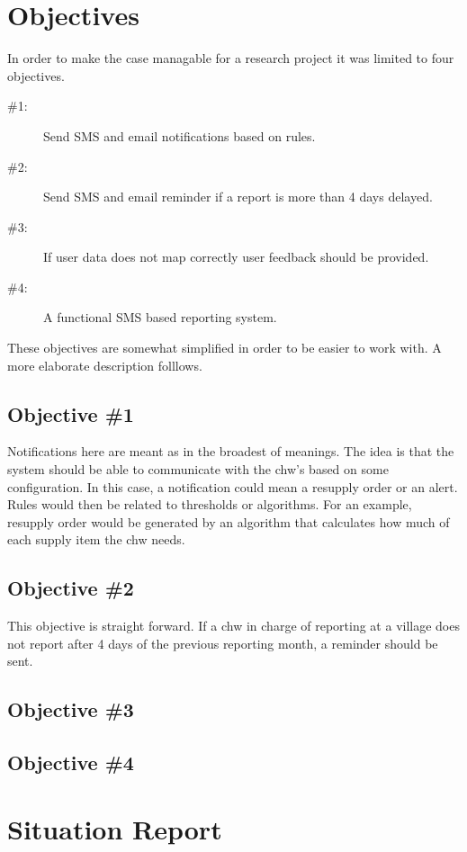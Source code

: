 \section{Objectives}
In order to make the case managable for a research project it was limited to four objectives. 

\begin{description}
\item[\#1:] Send SMS and email notifications based on rules.
\item[\#2:] Send SMS and email reminder if a report is more than 4 days delayed.
\item[\#3:] If user data does not map correctly user feedback should be provided.
\item[\#4:] A functional SMS based reporting system.
\end{description}

These objectives are somewhat simplified in order to be easier to work with. A more elaborate description folllows. 
\subsection{Objective \#1}
Notifications here are meant as in the broadest of meanings. The idea is that the system should be able to communicate with the \gls{chw}'s based on some configuration. In this case, a notification could mean a resupply order or an alert. Rules would then be related to thresholds or algorithms. For an example, resupply order would be generated by an algorithm that calculates how much of each supply item the \gls{chw} needs. 
\subsection{Objective \#2}
This objective is straight forward. If a \gls{chw} in charge of reporting at a village does not report after 4 days of the previous reporting month, a reminder should be sent. 
\subsection{Objective \#3}

\subsection{Objective \#4}
\section{Situation Report}


